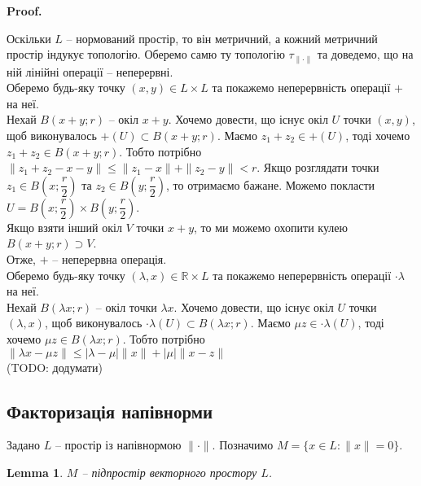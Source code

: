 \documentclass[a4paper, 10pt]{article}
\makeatletter
\theoremstyle{theoremdd}
\theoremstyle{theoremdd}
\theoremstyle{theoremdd}
\theoremstyle{theoremdd}
\theoremstyle{theoremdd}
\theoremstyle{theoremdd}
\theoremstyle{theoremdd}
\newtheorem{lemma}[theorem]{Lemma}
\theoremstyle{theoremdd}
\renewenvironment{proof}[1][Proof.\\]{\par
\pushQED{\hfill \qed}%
\normalfont \topsep6\p@\@plus6\p@\relax
\trivlist
\item\relax
{\bfseries
#1\@addpunct{.}}\hspace\labelsep\ignorespaces
}{%
\popQED\endtrivlist\@endpefalse
}
\makeatother
\begin{document}
\begin{proof}
Оскільки $L$ -- нормований простір, то він метричний, а кожний метричний простір індукує топологію. Оберемо самю ту топологію $\tau_{\| \cdot \|}$ та доведемо, що на ній лінійні операції -- неперервні.\\
Оберемо будь-яку точку $(x,y) \in L \times L$ та покажемо неперервність операції $+$ на неї.\\
Нехай $B(x+y;r)$ -- окіл $x+y$. Хочемо довести, що існує окіл $U$ точки $(x,y)$, щоб виконувалось $+(U) \subset B(x+y;r)$. Маємо $z_1+z_2 \in +(U)$, тоді хочемо $z_1+z_2 \in B(x+y;r)$. Тобто потрібно $\|z_1 + z_2 - x - y\| \leq \|z_1 - x\| + \|z_2 - y\| < r$. Якщо розглядати точки $z_1 \in B\left(x; \dfrac{r}{2}\right)$ та $z_2 \in B\left(y; \dfrac{r}{2}\right)$, то отримаємо бажане. Можемо покласти $U = B\left(x; \dfrac{r}{2}\right) \times B\left(y; \dfrac{r}{2}\right)$.\\
Якщо взяти інший окіл $V$ точки $x+y$, то ми можемо охопити кулею $B(x+y;r) \supset V$.\\
Отже, $+$ -- неперервна операція.
\bigskip \\
Оберемо будь-яку точку $(\lambda,x) \in \mathbb{R} \times L$ та покажемо неперервність операції $\cdot \lambda$ на неї.\\
Нехай $B(\lambda x;r)$ -- окіл точки $\lambda x$. Хочемо довести, що існує окіл $U$ точки $(\lambda,x)$, щоб виконувалось $\cdot \lambda(U) \subset B(\lambda x;r)$. Маємо $\mu z \in \cdot \lambda(U)$, тоді хочемо $\mu z \in B(\lambda x;r)$. Тобто потрібно\\
$\| \lambda x - \mu z \| \leq |\lambda - \mu| \|x\| + |\mu| \|x-z\|$\\
(TODO: додумати)
\end{proof}

\subsection{Факторизація напівнорми}
Задано $L$ -- простір із напівнормою $\| \cdot \|$. Позначимо $M = \{x \in L: \|x\| = 0\}$.

\begin{lemma}
$M$ -- підпростір векторного простору $L$.
\end{lemma}
\end{document}
